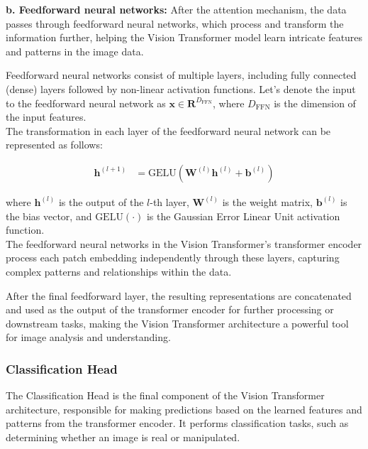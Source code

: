 \noindent \textbf{b. Feedforward neural networks:} After the attention mechanism, the data passes through feedforward neural networks, which process and transform the information further, helping the Vision Transformer model learn intricate features and patterns in the image data.

\noindent Feedforward neural networks consist of multiple layers, including fully connected (dense) layers followed by non-linear activation functions. Let's denote the input to the feedforward neural network as $\mathbf{x} \in \mathbf{R}^{D_{\text{FFN}}}$, where $D_{\text{FFN}}$ is the dimension of the input features.
\\

\noindent The transformation in each layer of the feedforward neural network can be represented as follows:

\begin{align}
    \mathbf{h}^{(l+1)} & = \text{GELU}\left(\mathbf{W}^{(l)} \mathbf{h}^{(l)} + \mathbf{b}^{(l)}\right) \label{eq:feedforward}
\end{align}

where $\mathbf{h}^{(l)}$ is the output of the $l$-th layer, $\mathbf{W}^{(l)}$ is the weight matrix, $\mathbf{b}^{(l)}$ is the bias vector, and $\text{GELU}(\cdot)$ is the Gaussian Error Linear Unit activation function.
\\

\noindent The feedforward neural networks in the Vision Transformer's transformer encoder process each patch embedding independently through these layers, capturing complex patterns and relationships within the data.

\noindent After the final feedforward layer, the resulting representations are concatenated and used as the output of the transformer encoder for further processing or downstream tasks, making the Vision Transformer architecture a powerful tool for image analysis and understanding.


\subsubsection{Classification Head}
The Classification Head is the final component of the Vision Transformer architecture, responsible for making predictions based on the learned features and patterns from the transformer encoder. It performs classification tasks, such as determining whether an image is real or manipulated.
\\

